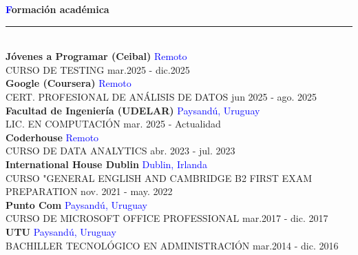 \documentclass[a4paper,10pt]{article}
\begin{document}
\begin{spacing}{1.1}
\noindent
{\Large\textbf{\textcolor{blue}{F}ormación académica}}
\hspace{0.3em}\rule[0.5ex]{\dimexpr\textwidth-15em}{0.4pt} \\[6pt]
\textbf{Jóvenes a Programar (Ceibal)} \hfill \textcolor{blue}{Remoto} \\
CURSO DE TESTING \hfill mar.2025 - dic.2025 \\
\textbf{Google (Coursera)} \hfill \textcolor{blue}{Remoto} \\
CERT. PROFESIONAL DE ANÁLISIS DE DATOS \hfill jun 2025 - ago. 2025  \\
\textbf{Facultad de Ingeniería (UDELAR)} \hfill \textcolor{blue}{Paysandú, Uruguay} \\
LIC. EN COMPUTACIÓN \hfill mar. 2025 - Actualidad \\
\textbf {Coderhouse} \hfill \textcolor{blue}{Remoto} \\
CURSO DE DATA ANALYTICS \hfill abr. 2023 - jul. 2023 \\
\textbf {International House Dublin} \hfill \textcolor{blue}{Dublin, Irlanda} \\
CURSO "GENERAL ENGLISH AND CAMBRIDGE B2 FIRST EXAM PREPARATION \hfill nov. 2021 - may. 2022 \\
\textbf {Punto Com} \hfill \textcolor{blue}{Paysandú, Uruguay} \\
CURSO DE MICROSOFT OFFICE PROFESSIONAL \hfill mar.2017 - dic. 2017 \\
\textbf {UTU} \hfill \textcolor{blue}{Paysandú, Uruguay} \\
BACHILLER TECNOLÓGICO EN ADMINISTRACIÓN \hfill mar.2014 - dic. 2016

\end{spacing}
\end{document}
